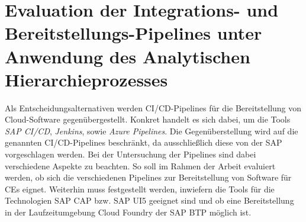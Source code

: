 \section{Evaluation der Integrations- und Bereitstellungs-Pipelines unter Anwendung des Analytischen Hierarchieprozesses}
\label{sec:AHP}
Als Entscheidungsalternativen werden CI/CD-Pipelines für die Bereitstellung von Cloud-Software gegenübergestellt. Konkret handelt es sich dabei, um die Tools \textit{SAP CI/CD}, \textit{Jenkins}, sowie \textit{Azure Pipelines}. Die Gegenüberstellung wird auf die genannten CI/CD-Pipelines beschränkt, da ausschließlich diese von der SAP vorgeschlagen werden. Bei der Untersuchung der Pipelines sind dabei verschiedene Aspekte zu beachten. So soll im Rahmen der Arbeit evaluiert werden, ob sich die verschiedenen Pipelines zur Bereitstellung von Software für CEs eignet. Weiterhin muss festgestellt werden, inwiefern die Tools für die Technologien SAP CAP bzw. SAP UI5 geeignet sind und ob eine Bereitstellung in der Laufzeitumgebung Cloud Foundry der SAP BTP möglich ist. 

